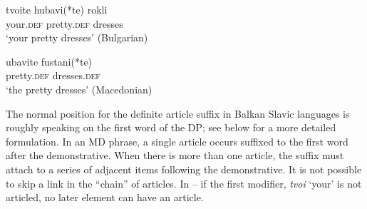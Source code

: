 \documentclass[output=paper,
colorlinks,
citecolor=brown,
newtxmath
]{langscibook}
\begin{document}
\ea \label{dresses3}
\ea \label{dresses3b}
\gll tvoite 	hubavi(*te) 	rokli\\
 	your.\textsc{def}	pretty.\textsc{def}	dresses \\
\glt ‘your pretty dresses’ \hfill(Bulgarian)

\ex \label{dresses3m}
\gll ubavite	fustani(*te) \\
pretty.\textsc{def} 	dresses.\textsc{def} \\
\glt ‘the pretty dresses’ \hfill(Macedonian)
\z
\z

\noindent The normal position for the definite article suffix in Balkan Slavic languages is roughly speaking on the first word of the DP; see below for a more detailed formulation. In an MD phrase, a single article occurs suffixed to the first word after the demonstrative. When there is more than one article, the suffix must attach to a series of adjacent items following the demonstrative. It is not possible to skip a link in the ``chain'' of articles. In -- if the first modifier, \textit{tvoi} `your' is not articled, no later element can have an article.


\ea \label{yourphoneb}
\z
\z

\end{document}
